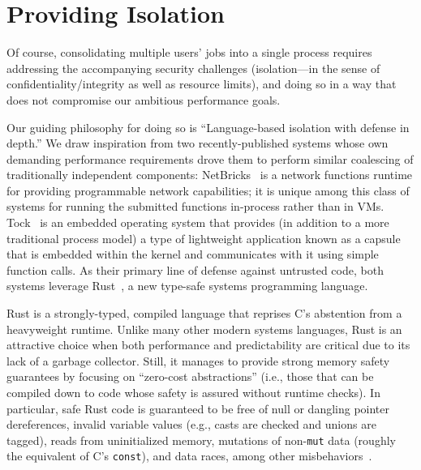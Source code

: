 \section{Providing Isolation}
\label{sec:isolation}

Of course, consolidating multiple users' jobs into a single process requires
addressing the accompanying security challenges (isolation---in the sense of
confidentiality/integrity as well as resource limits), and doing so in a way that
does not compromise our ambitious performance goals.

Our guiding philosophy for doing so is ``Language-based isolation with defense in depth.''
We draw inspiration from two recently-published systems whose own demanding
performance requirements drove them to perform similar coalescing of traditionally
independent components:  NetBricks~\cite{Panda2016} is a network functions runtime
for providing programmable network capabilities; it is unique among this class of
systems for running the submitted functions in-process rather than in VMs.
Tock~\cite{Levy2017} is an embedded operating system that provides (in addition to a
more traditional process model) a type of lightweight application known as a capsule
that is embedded within the kernel and communicates with it using simple function
calls.  As their primary line of defense against untrusted code, both systems
leverage Rust~\cite{www-rustlang}, a new type-safe systems programming language.

Rust is a strongly-typed, compiled language that reprises C's abstention from a
heavyweight runtime.  Unlike many other modern systems languages, Rust is an
attractive choice when both performance and predictability are critical due to its
lack of a garbage collector.  Still, it manages to provide strong memory safety
guarantees by focusing on ``zero-cost abstractions'' (i.e., those that can be
compiled down to code whose safety is assured without runtime checks).  In
particular, safe Rust code is guaranteed to be free of null or dangling pointer
dereferences, invalid variable values (e.g., casts are checked and unions are
tagged), reads from uninitialized memory, mutations of non-\texttt{mut} data (roughly
the equivalent of C's \texttt{const}), and data races, among other
misbehaviors~\cite{www-rustlang-ub}.

